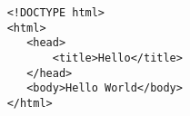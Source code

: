 \documentclass{article}
\begin{document}
\begin{verbatim}
    <!DOCTYPE html>
    <html>
       <head>
           <title>Hello</title>
       </head>
       <body>Hello World</body>
    </html>
\end{verbatim}
\end{document}
